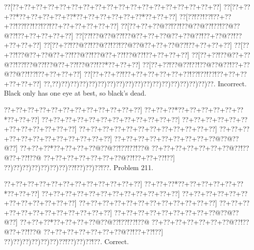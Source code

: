 \documentclass[a5paper]{article}
\begin{document}
\begin{center}
{\goo
\0??[\0??+\0??+\0??+\0??+\0??+\0??+\0??+\0??+\0??+\0??+\0??+\0??+\0??+\0??+\0??+\0??+\0??+\0??]
\0??[\0??+\0??+\0??*\0??+\0??+\0??+\0??+\0??*\0??+\0??+\0??+\0??+\0??+\0??*\0??+\0??+\0??]
\0??[\0??!\0??!\0??!\0??+\0??+\0??!\0??!\0??!\0??!\0??!\0??+\0??+\0??+\0??+\0??+\0??]
\0??[\0??+\0??+\0??@\0??!\0??!\0??@\0??@\0??!\0??!\0??@\0??@\0??!\0??+\0??+\0??+\0??+\0??]
\0??[\0??!\0??@\0??@\0??!\0??@\0??+\0??+\0??@\0??+\0??@\0??!\0??+\0??@\0??!\0??+\0??+\0??+\0??]
\0??[\0??+\0??!\0??@\0??!\0??@\0??!\0??!\0??@\0??@\0??+\0??+\0??@\0??!\0??+\0??+\0??+\0??]
\0??[\0??+\0??!\0??@\0??+\0??@\0??+\0??!\0??@\0??!\0??@\0??+\0??!\0??@\0??!\0??+\0??+\0??+\0??]
\0??[\0??+\0??!\0??@\0??+\0??@\0??!\0??!\0??@\0??!\0??@\0??+\0??!\0??@\0??!\0??*\0??+\0??+\0??]
\0??[\0??+\0??!\0??@\0??!\0??!\0??@\0??@\0??!\0??+\0??@\0??@\0??!\0??!\0??+\0??+\0??+\0??]
\0??[\0??+\0??+\0??!\0??+\0??+\0??+\0??+\0??+\0??!\0??!\0??!\0??!\0??+\0??+\0??+\0??+\0??+\0??]
\0??,\0??)\0??)\0??)\0??)\0??)\0??)\0??)\0??)\0??)\0??)\0??)\0??)\0??)\0??)\0??)\0??)\0??)\0??.
}
Incorrect. Black only has one eye at best, so black's dead.

\end{center}
\newpage
\begin{center}
{\goo
\0??+\0??+\0??+\0??+\0??+\0??+\0??+\0??+\0??+\0??+\0??+\0??]
\0??+\0??+\0??*\0??+\0??+\0??+\0??+\0??+\0??*\0??+\0??+\0??]
\0??+\0??+\0??+\0??+\0??+\0??+\0??+\0??+\0??+\0??+\0??+\0??]
\0??+\0??+\0??+\0??+\0??+\0??+\0??+\0??+\0??+\0??+\0??+\0??]
\0??+\0??+\0??+\0??+\0??+\0??+\0??+\0??+\0??+\0??+\0??+\0??]
\0??+\0??+\0??+\0??+\0??+\0??+\0??+\0??+\0??+\0??+\0??+\0??]
\0??+\0??+\0??+\0??+\0??+\0??+\0??+\0??+\0??@\0??@\0??@\0??]
\0??+\0??+\0??*\0??+\0??+\0??+\0??@\0??@\0??!\0??!\0??!\0??@
\0??+\0??+\0??+\0??+\0??+\0??+\0??@\0??!\0??@\0??+\0??!\0??@
\0??+\0??+\0??+\0??+\0??+\0??+\0??@\0??!\0??+\0??+\0??!\0??]
\0??)\0??)\0??)\0??)\0??)\0??)\0??)\0??!\0??)\0??)\0??!\0??.
}
Problem 211.

\end{center}
\begin{center}
{\goo
\0??+\0??+\0??+\0??+\0??+\0??+\0??+\0??+\0??+\0??+\0??+\0??]
\0??+\0??+\0??*\0??+\0??+\0??+\0??+\0??+\0??*\0??+\0??+\0??]
\0??+\0??+\0??+\0??+\0??+\0??+\0??+\0??+\0??+\0??+\0??+\0??]
\0??+\0??+\0??+\0??+\0??+\0??+\0??+\0??+\0??+\0??+\0??+\0??]
\0??+\0??+\0??+\0??+\0??+\0??+\0??+\0??+\0??+\0??+\0??+\0??]
\0??+\0??+\0??+\0??+\0??+\0??+\0??+\0??+\0??+\0??+\0??+\0??]
\0??+\0??+\0??+\0??+\0??+\0??+\0??+\0??+\0??@\0??@\0??@\0??]
\0??+\0??+\0??*\0??+\0??+\0??+\0??@\0??@\0??!\0??!\0??!\0??@
\0??+\0??+\0??+\0??+\0??+\0??+\0??@\0??!\0??@\0??+\0??!\0??@
\0??+\0??+\0??+\0??+\0??+\0??+\0??@\0??!\0??+\0??!\0??]
\0??)\0??)\0??)\0??)\0??)\0??)\0??!\0??)\0??)\0??!\0??.
}
Correct. 

\end{center}
\end{document}
